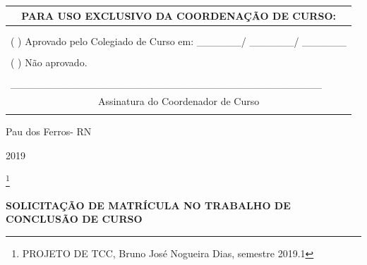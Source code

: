 \documentclass[12pt,openright,oneside,a4paper,ruledheader,pnumromarab,english]{abntex2}
\begin{document}
\begin{capa}
\vspace{1cm}
\begin{table}[!htb]
\begin{tabular}{|l|}
\hline
\multicolumn{1}{|c|}{{\color[HTML]{333333} \textbf{PARA USO EXCLUSIVO DA COORDENAÇÃO DE CURSO:}}}            \\ \hline
                                                                                                             \\
                                                                                                             \\
(  \hspace{0.5cm}   ) Aprovado pelo Colegiado de Curso em: \_\_\_\_\_\_/ \_\_\_\_\_\_/ \_\_\_\_\_\_              \\
                                            \\
(    \hspace{0.5cm}  ) Não aprovado.                                                                              \\
                                                                                                     \\
\_\_\_\_\_\_\_\_\_\_\_\_\_\_\_\_\_\_\_\_\_\_\_\_\_\_\_\_\_\_\_\_\_\_\_\_\_\_\_\_\_\_            \\
\multicolumn{1}{|c|}{Assinatura do Coordenador de Curso}                                          \\ 
                                                                                                     \\
\hline
\end{tabular}
\end{table}


   
     \vspace{3cm}
    \begin{center}
       Pau dos Ferros- RN
    \end{center}
    \begin{center}
        2019
    \end{center}
  \footnote{PROJETO DE TCC, Bruno José Nogueira Dias, semestre 2019.1}
  \end{capa}

\frenchspacing 
\begin{center}
    \textbf{SOLICITAÇÃO DE MATRÍCULA NO TRABALHO DE CONCLUSÃO DE CURSO}
\end{center}
\end{document}
